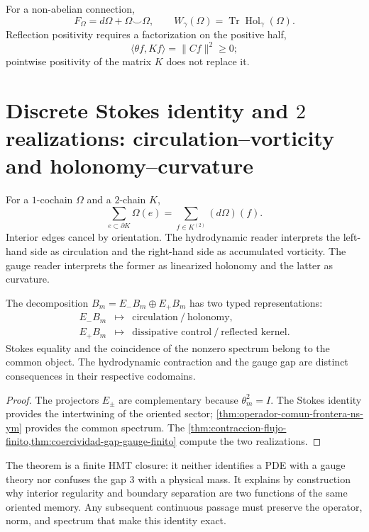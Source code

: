 For a non-abelian connection,
\[
 F_\Omega=d\Omega+\Omega\smile\Omega,
\qquad
 W_\gamma(\Omega)=\operatorname{Tr}\operatorname{Hol}_\gamma(\Omega).
\]
Reflection positivity requires a factorization on the positive half,
\[
 \langle\theta f,Kf\rangle=\|Cf\|^2\geq0;
\]
pointwise positivity of the matrix \(K\) does not replace it.

\section[Stokes Identity: Circulation--Vorticity and Holonomy--Curvature]{Discrete Stokes identity and \(2\) realizations: circulation--vorticity and holonomy--curvature}

For a \(1\)-cochain \(\Omega\) and a \(2\)-chain \(K\),
\[
 \sum_{e\subset\partial K}\Omega(e)
 =
 \sum_{f\in K^{(2)}}(d\Omega)(f).
\]
Interior edges cancel by orientation. The hydrodynamic
reader interprets the left-hand side as circulation and the right-hand side
as accumulated vorticity. The gauge reader interprets the former as
linearized holonomy and the latter as curvature.

\begin{theorem}
\label{thm:hoja-comun-frontera}
The decomposition \(B_m=E_-B_m\oplus E_+B_m\) has two typed
representations:
\[
\boxed{
\begin{array}{ccl}
E_-B_m&\longmapsto&
\text{circulation}\ /\ \text{holonomy},\\[2mm]
E_+B_m&\longmapsto&
\text{dissipative control}\ /\ \text{reflected kernel}.
\end{array}}
\]
Stokes equality and the coincidence of the nonzero spectrum belong to the
common object. The hydrodynamic contraction and the gauge gap are distinct
consequences in their respective codomains.
\end{theorem}

\begin{proof}
The projectors \(E_\pm\) are complementary because
\(\theta_m^2=I\). The Stokes identity provides the intertwining of the
oriented sector; \cref{thm:operador-comun-frontera-ns-ym} provides the
common spectrum. The
\cref{thm:contraccion-flujo-finito,thm:coercividad-gap-gauge-finito}
compute the two realizations.
\end{proof}

The theorem is a finite HMT closure: it neither identifies a PDE with a gauge theory nor confuses the gap \(3\) with a physical mass. It explains by construction why interior regularity and boundary separation are two functions of the same oriented memory. Any subsequent continuous passage must preserve the operator, norm, and spectrum that make this identity exact. \endgroup
